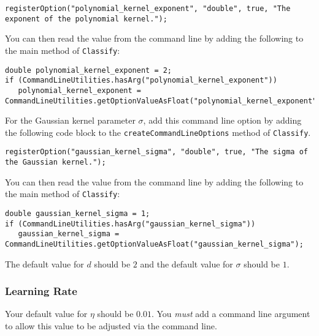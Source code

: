 \documentclass[11pt]{article}
\newcommand{\code}[1]{{\footnotesize \tt #1}}
\begin{document}
\begin{footnotesize}
\begin{verbatim}
registerOption("polynomial_kernel_exponent", "double", true, "The exponent of the polynomial kernel.");
\end{verbatim}
\end{footnotesize}

You can then read the value from the command line by adding the following to the main method of \code{Classify}:
\begin{footnotesize}
\begin{verbatim}
double polynomial_kernel_exponent = 2;
if (CommandLineUtilities.hasArg("polynomial_kernel_exponent"))
   polynomial_kernel_exponent = CommandLineUtilities.getOptionValueAsFloat("polynomial_kernel_exponent");
\end{verbatim}
\end{footnotesize}

For the Gaussian kernel parameter $\sigma$, add this command line option by adding the following code block to the \code{createCommandLineOptions} method of \code{Classify}.

\begin{footnotesize}
\begin{verbatim}
registerOption("gaussian_kernel_sigma", "double", true, "The sigma of the Gaussian kernel.");
\end{verbatim}
\end{footnotesize}

You can then read the value from the command line by adding the following to the main method of \code{Classify}:
\begin{footnotesize}
\begin{verbatim}
double gaussian_kernel_sigma = 1;
if (CommandLineUtilities.hasArg("gaussian_kernel_sigma"))
   gaussian_kernel_sigma = CommandLineUtilities.getOptionValueAsFloat("gaussian_kernel_sigma");
\end{verbatim}
\end{footnotesize}

The default value for $d$ should be $2$ and the default value for $\sigma$ should be $1$.





\subsubsection{Learning Rate}
\label{sec:learning_rate}
Your default value for $\eta$ should be $0.01$. You \emph{must} add a command line argument to allow this value to be adjusted via the command line. 
\end{document}
